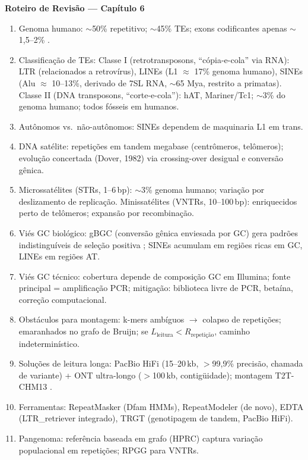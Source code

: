 \clearpage
\begin{destaque}
\textbf{Roteiro de Revisão --- Capítulo 6}
\begin{enumerate}\small
    \item Genoma humano: $\sim$50\% repetitivo; $\sim$45\% TEs; exons codificantes apenas $\sim$1,5--2\% \parencite{lander2001,dekonig2011}.
    \item Classificação de TEs: Classe I (retrotransposons, ``cópia-e-cola'' via RNA): LTR (relacionados a retrovírus), LINEs (L1 $\approx$ 17\% genoma humano), SINEs (Alu $\approx$ 10--13\%, derivado de 7SL RNA, $\sim$65 Mya, restrito a primatas). Classe II (DNA transposons, ``corte-e-cola''): hAT, Mariner/Tc1; $\sim$3\% do genoma humano; todos fósseis em humanos.
    \item Autônomos vs.\ não-autônomos: SINEs dependem de maquinaria L1 em trans.
    \item DNA satélite: repetições em tandem megabase (centrômeros, telômeros); evolução concertada (Dover, 1982) via crossing-over desigual e conversão gênica.
    \item Microssatélites (STRs, 1--6\,bp): $\sim$3\% genoma humano; variação por deslizamento de replicação. Minissatélites (VNTRs, 10--100\,bp): enriquecidos perto de telômeros; expansão por recombinação.
    \item Viés GC biológico: gBGC (conversão gênica enviesada por GC) gera padrões indistinguíveis de seleção positiva \parencite{galtier2001}; SINEs acumulam em regiões ricas em GC, LINEs em regiões AT.
    \item Viés GC técnico: cobertura depende de composição GC em Illumina; fonte principal = amplificação PCR; mitigação: biblioteca livre de PCR, betaína, correção computacional.
    \item Obstáculos para montagem: k-mers ambíguos $\to$ colapso de repetições; emaranhados no grafo de Bruijn; se $L_{\text{leitura}} < R_{\text{repetição}}$, caminho indeterminístico.
    \item Soluções de leitura longa: PacBio HiFi (15--20\,kb, $>$99,9\% precisão, chamada de variante) + ONT ultra-longo ($>$100\,kb, contigüidade); montagem T2T-CHM13 \parencite{nurk2022}.
    \item Ferramentas: RepeatMasker (Dfam HMMs), RepeatModeler (de novo), EDTA (LTR\_retriever integrado), TRGT (genotipagem de tandem, PacBio HiFi).
    \item Pangenoma: referência baseada em grafo (HPRC) captura variação populacional em repetições; RPGG para VNTRs.
\end{enumerate}
\end{destaque}

\clearpage

\printbibliography[heading=subbibliography,title={Referências}]

